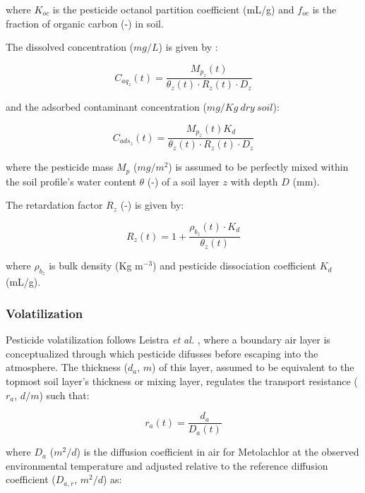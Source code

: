 \documentclass[]{article}
\begin{document}
where \(K_{oc}\) is the pesticide octanol partition coefficient (mL/g)
and \(f_{oc}\) is the fraction of organic carbon (-) in soil.

The dissolved concentration (\(mg/L\)) is given by \citep{Whelan1987}:

\begin{equation}
C_{aq_z}(t) = \frac{ M_{p_z}(t) }{\theta_z(t) \cdot R_z{(t)} \cdot D_{z} }
\label{eq:conc_aq}
\end{equation}

and the adsorbed contaminant concentration (\(mg/Kg~dry~soil\)):

\begin{equation}
C_{ads_z}(t) = \frac{ M_{p_z}(t) K_d}{\theta_z(t) \cdot R_z{(t)} \cdot D_{z} }
\label{eq:conc_ads}
\end{equation}

where the pesticide mass \(M_p\) (\(mg/m^2\)) is assumed to be perfectly
mixed within the soil profile's water content \(\theta\) (-) of a soil
layer \(z\) with depth \(D\) (mm).

The retardation factor \(R_z\) (-) is given by:

\begin{equation}
R_z(t) = 1 + \frac{ \rho_{b_z}(t) \cdot K_d }{ \theta_z(t) }
\label{eq:retard_linear}
\end{equation}

where \(\rho_{b_z}\) is bulk density (Kg m\(^{-3}\)) and pesticide
dissociation coefficient \(K_d\) (mL/g).

\hypertarget{volatilization}{%
\subsubsection{Volatilization}\label{volatilization}}

Pesticide volatilization follows Leistra \textit{et al.}
\citeyearpar{Leistra2001}, where a boundary air layer is conceptualized
through which pesticide difusses before escaping into the atmosphere.
The thickness (\(d_a\), \(m\)) of this layer, assumed to be equivalent
to the topmost soil layer's thickness or mixing layer, regulates the
transport resistance (\(r_a\), \(d/m\)) such that:

\begin{equation}
r_a(t) = \frac{ d_a }{ D_a(t) }
\label{eq:resistance_air}
\end{equation}

where \(D_a\) (\(m^2/d\)) is the diffusion coefficient in air for
Metolachlor at the observed environmental temperature and adjusted
relative to the reference diffusion coefficient (\(D_{a,r}\), \(m^2/d\))
as:
\end{document}
